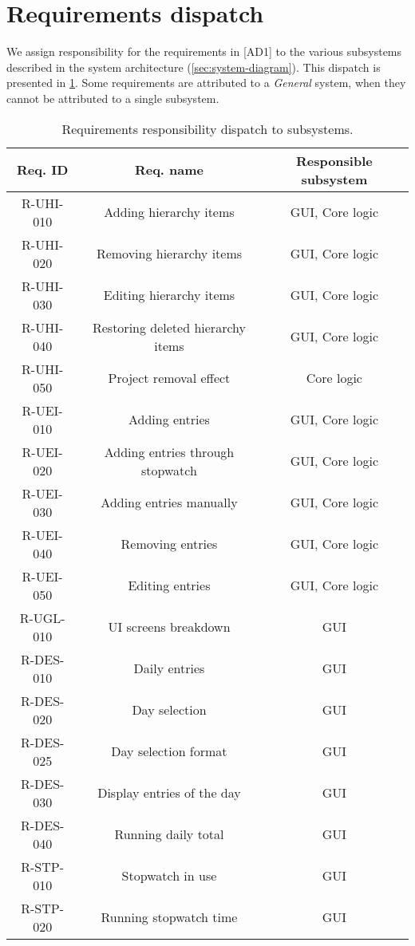 \section{Requirements dispatch} \label{sec:req-dispatch}
We assign responsibility for the requirements in [AD1] to the various subsystems
described in the system architecture (\cref{sec:system-diagram}). This dispatch
is presented in \cref{tab:req-dispatch}. Some requirements are attributed
to a \emph{General} system, when they cannot be attributed to a single
subsystem.

\begin{longtable}{| c | c | c |}
  \caption{\label{tab:req-dispatch} Requirements responsibility dispatch to
    subsystems.} \\ \hline
  \textbf{Req. ID} & \textbf{Req. name} & \textbf{Responsible subsystem} \\ \hline
  R-UHI-010 & Adding hierarchy items & GUI, Core logic \\ \hline
  R-UHI-020 & Removing hierarchy items & GUI, Core logic \\ \hline
  R-UHI-030 & Editing hierarchy items & GUI, Core logic \\ \hline
  R-UHI-040 & Restoring deleted hierarchy items & GUI, Core logic \\ \hline
  R-UHI-050 & Project removal effect & Core logic \\ \hline
  R-UEI-010 & Adding entries & GUI, Core logic \\ \hline
  R-UEI-020 & Adding entries through stopwatch & GUI, Core logic \\ \hline
  R-UEI-030 & Adding entries manually & GUI, Core logic \\ \hline
  R-UEI-040 & Removing entries & GUI, Core logic \\ \hline
  R-UEI-050 & Editing entries & GUI, Core logic \\ \hline
  R-UGL-010 & UI screens breakdown & GUI \\ \hline
  R-DES-010 & Daily entries & GUI \\ \hline
  R-DES-020 & Day selection & GUI \\ \hline
  R-DES-025 & Day selection format & GUI \\ \hline
  R-DES-030 & Display entries of the day & GUI \\ \hline
  R-DES-040 & Running daily total & GUI \\ \hline
  R-STP-010 & Stopwatch in use & GUI \\ \hline
  R-STP-020 & Running stopwatch time & GUI \\ \hline

\end{longtable}
